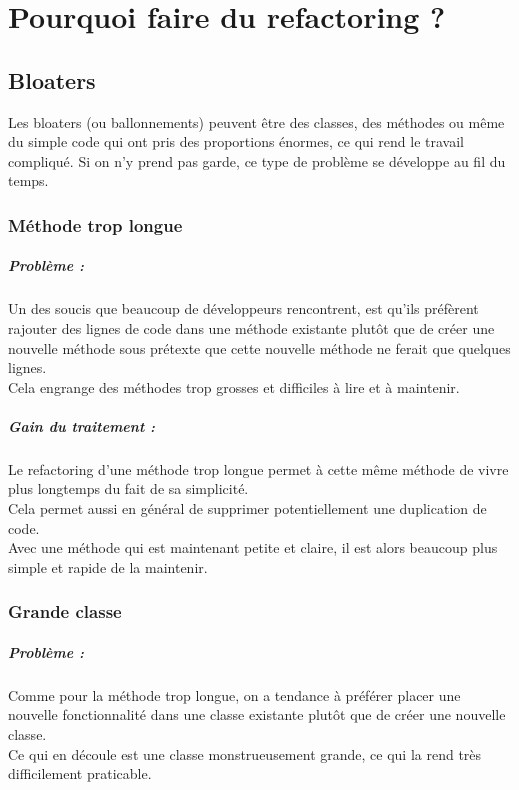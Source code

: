 \documentclass[a4paper,twoside,12pt,openright]{report}
\begin{document}
\chapter{Pourquoi faire du refactoring ?}
\section{Bloaters}
Les bloaters (ou ballonnements) peuvent être des classes, des méthodes ou même du simple code qui ont pris des proportions énormes, ce qui rend le travail  compliqué. Si on n'y prend pas garde, ce type de problème se développe au fil du temps.\\

\subsection{Méthode trop longue}
\paragraph{Problème :}
Un des soucis que beaucoup de développeurs rencontrent, est qu'ils préfèrent rajouter des lignes de code dans une méthode existante plutôt que de créer une nouvelle méthode sous prétexte que cette nouvelle méthode ne ferait que quelques lignes.\\
Cela engrange des méthodes trop grosses et difficiles à lire et à maintenir.\\

\paragraph{Gain du traitement :}
Le refactoring d'une méthode trop longue permet à cette même méthode de vivre plus longtemps du fait de sa simplicité.\\
Cela permet aussi en général de supprimer potentiellement une duplication de code.\\
Avec une méthode qui est maintenant petite et claire, il est alors beaucoup plus simple et rapide de la maintenir.\\

\subsection{Grande classe}
\paragraph{Problème :}
Comme pour la méthode trop longue, on a tendance à préférer placer une nouvelle fonctionnalité dans une classe existante plutôt que de créer une nouvelle classe.\\
Ce qui en découle est une classe monstrueusement grande, ce qui la rend très difficilement praticable.\\
\end{document}
